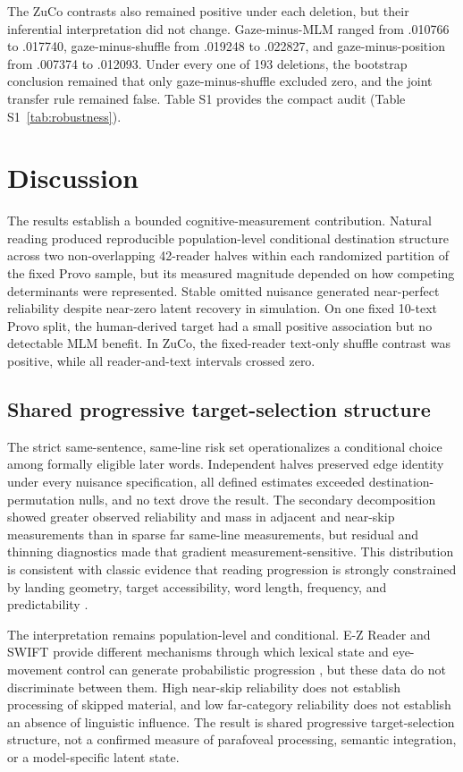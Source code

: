 \documentclass[11pt]{article}
\begin{document}
The ZuCo contrasts also remained positive under each deletion, but their inferential interpretation did not change. Gaze-minus-MLM ranged from .010766 to .017740, gaze-minus-shuffle from .019248 to .022827, and gaze-minus-position from .007374 to .012093. Under every one of 193 deletions, the bootstrap conclusion remained that only gaze-minus-shuffle excluded zero, and the joint transfer rule remained false. Table S1 provides the compact audit (Table S1~\ref{tab:robustness}).

\section{Discussion}

The results establish a bounded cognitive-measurement contribution. Natural reading produced reproducible population-level conditional destination structure across two non-overlapping 42-reader halves within each randomized partition of the fixed Provo sample, but its measured magnitude depended on how competing determinants were represented. Stable omitted nuisance generated near-perfect reliability despite near-zero latent recovery in simulation. On one fixed 10-text Provo split, the human-derived target had a small positive association but no detectable MLM benefit. In ZuCo, the fixed-reader text-only shuffle contrast was positive, while all reader-and-text intervals crossed zero.

\subsection{Shared progressive target-selection structure}

The strict same-sentence, same-line risk set operationalizes a conditional choice among formally eligible later words. Independent halves preserved edge identity under every nuisance specification, all defined estimates exceeded destination-permutation nulls, and no text drove the result. The secondary decomposition showed greater observed reliability and mass in adjacent and near-skip measurements than in sparse far same-line measurements, but residual and thinning diagnostics made that gradient measurement-sensitive. This distribution is consistent with classic evidence that reading progression is strongly constrained by landing geometry, target accessibility, word length, frequency, and predictability \citep{rayner1979,rayner1998,mcconkie1988,drieghe2005,rayner2004frequency,rayner2011}.

The interpretation remains population-level and conditional. E-Z Reader and SWIFT provide different mechanisms through which lexical state and eye-movement control can generate probabilistic progression \citep{reichle2003,engbert2005}, but these data do not discriminate between them. High near-skip reliability does not establish processing of skipped material, and low far-category reliability does not establish an absence of linguistic influence. The result is shared progressive target-selection structure, not a confirmed measure of parafoveal processing, semantic integration, or a model-specific latent state.
\end{document}

